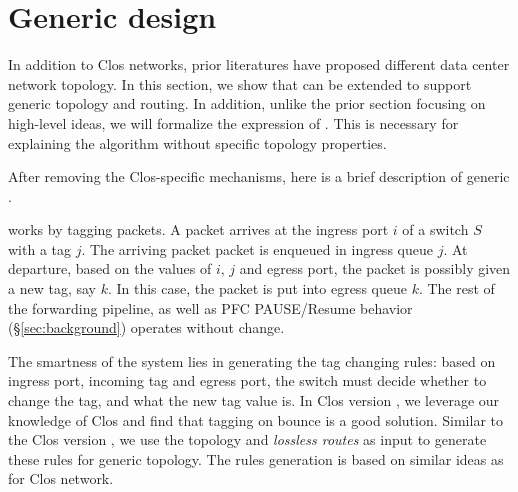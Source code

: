 \section{Generic \sysname{} design}
\label{sec:generic}

In addition to Clos networks, prior literatures have proposed different data center
network topology. In this section, we show that \sysname{} can be extended to
support generic topology and routing. In addition, unlike the prior section focusing 
on high-level ideas, we will formalize the expression of \sysname{}. This is necessary
for explaining the algorithm without specific topology properties.

After removing the Clos-specific mechanisms, here is a brief description of 
generic \sysname{}.


\sysname{} works by tagging packets.  A packet arrives at the ingress port $i$
of a switch $S$ with a tag $j$. The arriving packet packet is enqueued in ingress 
queue $j$.  At departure, based on the values of $i$, $j$ and egress port, 
the packet is possibly given a new tag, say $k$. In this case, the packet is put 
into egress queue $k$. The rest of the forwarding pipeline, as well as PFC 
PAUSE/Resume behavior (\S\ref{sec:background}) operates without change. 

The smartness of the system lies in generating the tag changing rules: based on 
ingress port, incoming tag and egress port, the switch must decide whether to change
the tag, and what the new tag value is. In Clos version \sysname{}, we leverage
our knowledge of Clos and find that tagging on bounce is a good solution. 
Similar to the Clos version \sysname{}, we use the topology and {\em lossless routes} 
as input to generate these rules for generic topology.
The rules generation is based on similar ideas as for Clos network.  




